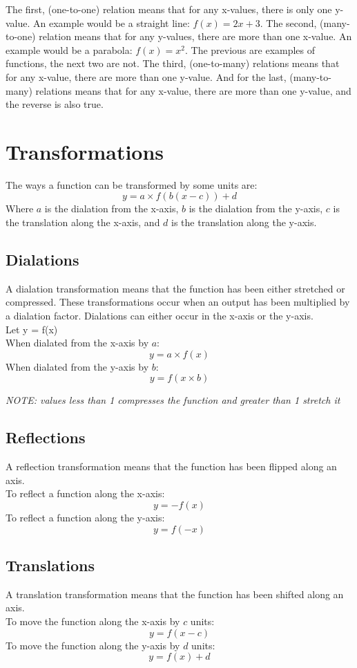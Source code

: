 \documentclass{report}
\begin{document}
The first, (one-to-one) relation means that for any x-values, there is only one y-value.  An example would be a straight line: $f(x) = 2x + 3$.  The second, (many-to-one) relation means that for any y-values, there are more than one x-value.  An example would be a parabola: $f(x) = x^2$.  The previous are examples of functions, the next two are not.  The third, (one-to-many) relations means that for any x-value, there are more than one y-value.  And for the last, (many-to-many) relations means that for any x-value, there are more than one y-value, and the reverse is also true.

\section{Transformations}
The ways a function can be transformed by some units are:
$$
	y = a \times f(b(x - c)) + d
$$
Where $a$ is the dialation from the x-axis, $b$ is the dialation from the y-axis, $c$ is the translation along the x-axis, and $d$ is the translation along the y-axis.

\subsection{Dialations}
A dialation transformation means that the function has been either stretched or compressed.  These transformations occur when an output has been multiplied by a dialation factor.  Dialations can either occur in the x-axis or the y-axis.\\
Let y = f(x)\\
When dialated from the x-axis by $a$:
$$
	y = a \times f(x)
$$
When dialated from the y-axis by $b$:
$$
	y = f(x \times b)
$$
\begin{center}
	\emph{NOTE:  values less than 1 compresses the function and greater than 1 stretch it}
\end{center}

\subsection{Reflections}
A reflection transformation means that the function has been flipped along an axis.\\
To reflect a function along the x-axis:
$$
	y = -f(x)
$$
To reflect a function along the y-axis:
$$
	y = f(-x)
$$

\subsection{Translations}
A translation transformation means that the function has been shifted along an axis.\\
To move the function along the x-axis by $c$ units:
$$
	y = f(x - c)
$$
To move the function along the y-axis by $d$ units:
$$
	y = f(x) + d
$$
\end{document}
